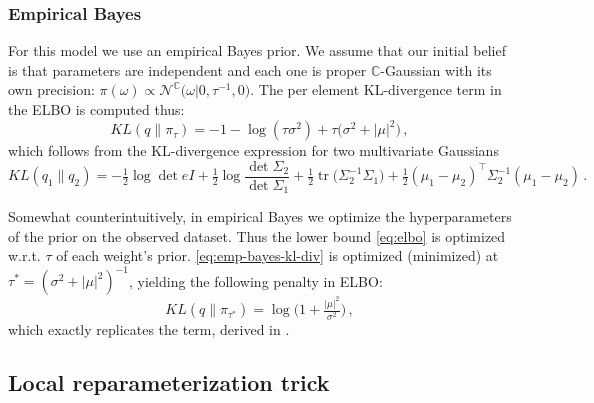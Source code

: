 \documentclass[a4paper,10pt]{article}
\newcommand{\cplx}{\mathbb{C}}
\newcommand{\tr}[1]{\mathop{tr}{#1}}
\begin{document}

\subsubsection{Empirical Bayes} %
\label{ssub:empirical_bayes}

For this model we use an empirical Bayes prior. We assume that our initial belief is that
parameters are independent and each one is proper $\cplx$-Gaussian with its own precision: $
  \pi(\omega)
    \propto \mathcal{N}^{\cplx}\bigl(
      \omega \vert 0, \tau^{-1}, 0
    \bigr)
$. The per element KL-divergence term in the ELBO is computed thus:
\begin{equation}  \label{eq:emp-bayes-kl-div}
KL(q \| \pi_\tau)
  = - 1 - \log{(\tau \sigma^2)}
    + \tau \bigl(
      \sigma^2 + \lvert \mu \rvert^2
    \bigr)
  \,,
\end{equation}
which follows from the KL-divergence expression for two multivariate Gaussians
$$
KL(q_1\| q_2)
  =
  - \tfrac12 \log \det{e I}
  + \tfrac12 \log \frac{\det{\Sigma_2}}{\det{\Sigma_1}}
  + \tfrac12 \tr{\bigl( \Sigma_2^{-1} \Sigma_1 \bigr)}
  + \tfrac12 (\mu_1 - \mu_2)^\top \Sigma_2^{-1} (\mu_1 - \mu_2)
  \,. $$

Somewhat counterintuitively, in empirical Bayes we optimize the hyperparameters of the
prior on the observed dataset. Thus the lower bound \eqref{eq:elbo} is optimized w.r.t.
$\tau$ of each weight's prior. \eqref{eq:emp-bayes-kl-div} is optimized (minimized) at
$\tau^\ast = (\sigma^2 + \lvert \mu \rvert^2)^{-1}$, yielding the following penalty in
ELBO:
\begin{equation}  \label{eq:emp-bayes-opt-kl}
KL(q \| \pi_{\tau^\ast})
  = \log{\bigl(1 + \tfrac{\lvert \mu \rvert^2}{\sigma^2}\bigr)}
  \,,
\end{equation}
which exactly replicates the term, derived in \cite{kharitonov_variational_2018}.



\subsection{Local reparameterization trick} %
\label{sub:local_reparameterization_trick}
\end{document}
